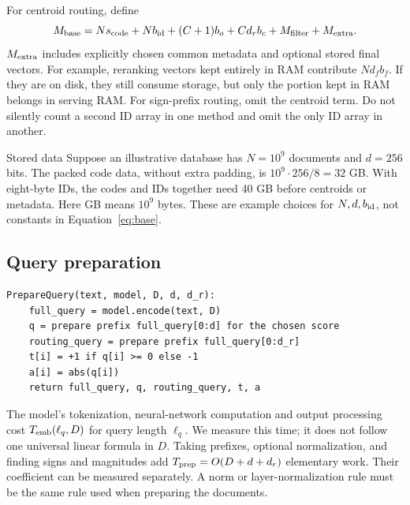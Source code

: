 For centroid routing, define
\begin{equation}
M_{\mathrm{base}}=N s_{\rm code}+N b_{\rm id}+(C+1)b_o+C d_r b_c+M_{\rm filter}+M_{\rm extra}.
\label{eq:base}
\end{equation}
$M_{\rm extra}$ includes explicitly chosen common metadata and optional stored final vectors.
For example, reranking vectors kept entirely in RAM contribute $N d_f b_f$. If they are on disk,
they still consume storage, but only the portion kept in RAM belongs in serving RAM. For
sign-prefix routing, omit the centroid term. Do not silently count a second ID array in one
method and omit the only ID array in another.

\begin{examplebox}{Stored data}
Suppose an illustrative database has $N=10^9$ documents and $d=256$ bits. The packed code data,
without extra padding, is $10^9\cdot256/8=32$ GB. With eight-byte IDs, the codes and IDs together
need 40 GB before centroids or metadata. Here GB means $10^9$ bytes. These are example choices
for $N,d,b_{\rm id}$, not constants in Equation~\eqref{eq:base}.
\end{examplebox}

\subsection{Query preparation}
\par\noindent\begin{minipage}{\linewidth}
\begin{lstlisting}[caption={Query preparation shared by all methods.}]
PrepareQuery(text, model, D, d, d_r):
    full_query = model.encode(text, D)
    q = prepare prefix full_query[0:d] for the chosen score
    routing_query = prepare prefix full_query[0:d_r]
    t[i] = +1 if q[i] >= 0 else -1
    a[i] = abs(q[i])
    return full_query, q, routing_query, t, a
\end{lstlisting}
\end{minipage}\par
The model's tokenization, neural-network computation and output processing cost
$T_{\rm emb}(\ell_q,D)$ for query length $\ell_q$. We measure this time; it does not follow one universal
linear formula in $D$. Taking prefixes, optional normalization, and finding signs and magnitudes add
$T_{\rm prep}=O(D+d+d_r)$ elementary work. Their coefficient can be measured separately.
A norm or layer-normalization rule must be the same rule used when preparing the documents.


